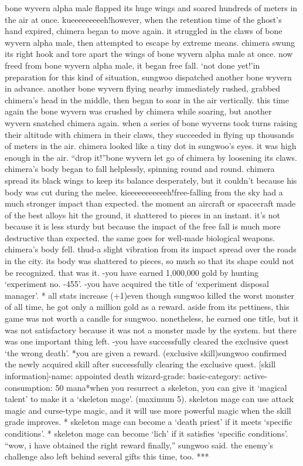 bone wyvern alpha male flapped its huge wings and soared hundreds of meters in the air at once.
kueeeeeeeeeh!however, when the retention time of the ghost’s hand expired, chimera began to move again.
it struggled in the claws of bone wyvern alpha male, then attempted to escape by extreme means.
chimera swung its right hook and tore apart the wings of bone wyvern alpha male at once.
now freed from bone wyvern alpha male, it began free fall.
‘not done yet!’in preparation for this kind of situation, sungwoo dispatched another bone wyvern in advance.
another bone wyvern flying nearby immediately rushed, grabbed chimera’s head in the middle, then began to soar in the air vertically.
this time again the bone wyvern was crushed by chimera while soaring, but another wyvern snatched chimera again.
when a series of bone wyverns took turns raising their altitude with chimera in their claws, they succeeded in flying up thousands of meters in the air.
 chimera looked like a tiny dot in sungwoo’s eyes.
it was high enough in the air.
“drop it!”bone wyvern let go of chimera by loosening its claws.
 chimera’s body began to fall helplessly, spinning round and round.
chimera spread its black wings to keep its balance desperately, but it couldn’t because his body was cut during the melee.
kieeeeeeeeeeeh!free-falling from the sky had a much stronger impact than expected.
the moment an aircraft or spacecraft made of the best alloys hit the ground, it shattered to pieces in an instant.
 it’s not because it is less sturdy but because the impact of the free fall is much more destructive than expected.
 the same goes for well-made biological weapons.
 chimera’s body fell.
thud-a slight vibration from its impact spread over the roads in the city.
 its body was shattered to pieces, so much so that its shape could not be recognized.
that was it.
-you have earned 1,000,000 gold by hunting ‘experiment no.
-455’.
-you have acquired the title of ‘experiment disposal manager’.
* all stats increase (+1)even though sungwoo killed the worst monster of all time, he got only a million gold as a reward.
 aside from its pettiness, this game was not worth a candle for sungwoo.
nonetheless, he earned one title, but it was not satisfactory because it was not a monster made by the system.
but there was one important thing left.
-you have successfully cleared the exclusive quest ‘the wrong death’.
*you are given a reward.
 (exclusive skill)sungwoo confirmed the newly acquired skill after successfully clearing the exclusive quest.
[skill information]-name: appointed death wizard-grade: basic-category: active-consumption: 50 mana*when you resurrect a skeleton, you can give it ‘magical talent’ to make it a ‘skeleton mage’.
 (maximum 5).
 skeleton mage can use attack magic and curse-type magic, and it will use more powerful magic when the skill grade improves.
* skeleton mage can become a ‘death priest’ if it meets ‘specific conditions’.
* skeleton mage can become ‘lich’ if it satisfies ‘specific conditions’.
“wow, i have obtained the right reward finally,” sungwoo said.
the enemy’s challenge also left behind several gifts this time, too.
***


